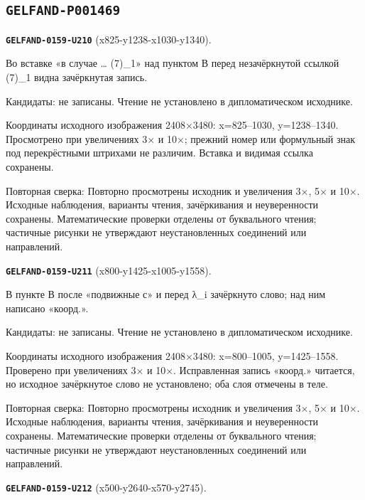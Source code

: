 \subsection*{\texttt{GELFAND-P001469}}
\par\noindent\leavevmode{}\label{GELFAND-0159-U210}\label{GELFAND-P001469:x825-y1238-x1030-y1340}\textbf{\texttt{GELFAND-0159-U210}} (x825-y1238-x1030-y1340).\nopagebreak[4]\par
Во вставке «в случае … (7)\_1» над пунктом В перед незачёркнутой ссылкой (7)\_1 видна зачёркнутая запись.\par
Кандидаты: не записаны. Чтение не установлено в дипломатическом исходнике.\par
Координаты исходного изображения 2408×3480: x=825–1030, y=1238–1340. Просмотрено при увеличениях 3× и 10×; прежний номер или формульный знак под перекрёстными штрихами не различим. Вставка и видимая ссылка сохранены.\par
Повторная сверка: Повторно просмотрены исходник и увеличения 3×, 5× и 10×. Исходные наблюдения, варианты чтения, зачёркивания и неуверенности сохранены. Математические проверки отделены от буквального чтения; частичные рисунки не утверждают неустановленных соединений или направлений.\par\medskip
\par\noindent\leavevmode{}\label{GELFAND-0159-U211}\label{GELFAND-P001469:x800-y1425-x1005-y1558}\textbf{\texttt{GELFAND-0159-U211}} (x800-y1425-x1005-y1558).\nopagebreak[4]\par
В пункте В после «подвижные с» и перед λ\_i зачёркнуто слово; над ним написано «коорд.».\par
Кандидаты: не записаны. Чтение не установлено в дипломатическом исходнике.\par
Координаты исходного изображения 2408×3480: x=800–1005, y=1425–1558. Проверено при увеличениях 3× и 10×. Исправленная запись «коорд.» читается, но исходное зачёркнутое слово не установлено; оба слоя отмечены в теле.\par
Повторная сверка: Повторно просмотрены исходник и увеличения 3×, 5× и 10×. Исходные наблюдения, варианты чтения, зачёркивания и неуверенности сохранены. Математические проверки отделены от буквального чтения; частичные рисунки не утверждают неустановленных соединений или направлений.\par\medskip
\par\noindent\leavevmode{}\label{GELFAND-0159-U212}\label{GELFAND-P001469:x500-y2640-x570-y2745}\textbf{\texttt{GELFAND-0159-U212}} (x500-y2640-x570-y2745).\nopagebreak[4]\par
